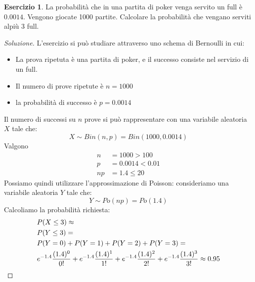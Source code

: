 \documentclass{article}
\theoremstyle{plain}
\theoremstyle{definition}
\newtheorem{esercizio}{Esercizio}[section]
\theoremstyle{remark}
\newenvironment{soluzione}
	{\renewcommand\qedsymbol{$\mathwitch*$}\begin{proof}[Soluzione]}
	{\end{proof}}
\renewcommand{\qedsymbol}{$\mathrightghost$}
\begin{document}
\begin{esercizio}
	La probabilità che in una partita di poker venga servito un full è $0.0014$. Vengono giocate 1000 partite. Calcolare la probabilità che vengano serviti alpiù 3 full.
	\begin{soluzione}
		L'esercizio si può studiare attraverso uno schema di Bernoulli in cui:
		\begin{itemize}
			\item La prova ripetuta è una partita di poker, e il successo consiste nel servizio di un full.
			\item Il numero di prove ripetute è $n=1000$
			\item la probabilità di successo è $p=0.0014$
		\end{itemize}
		Il numero di successi su $n$ prove si può rappresentare con una variabile aleatoria $X$ tale che:
		\begin{equation*}
			X\sim Bin(n,p)=Bin(1000,0.0014)
		\end{equation*}
		Valgono
		\begin{align*}
			n&=1000>100\\
			p&=0.0014<0.01\\
			np&=1.4\leq20
		\end{align*}
		Possiamo quindi utilizzare l'approssimazione di Poisson: consideriamo una variabile aleatoria $Y$ tale che:
		\begin{equation*}
			Y\sim Po(np)=Po(1.4)
		\end{equation*}
		Calcoliamo la probabilità richiesta:
		\begin{align*}
			&P(X\leq3)\approx\\
			& P(Y\leq3)=\\
			&P(Y=0)+P(Y=1)+P(Y=2)+P(Y=3)=\\
			&e^{-1.4}\frac{(1.4)^0}{0!}+e^{-1.4}\frac{(1.4)^1}{1!}+e^{-1.4}\frac{(1.4)^2}{2!}+e^{-1.4}\frac{(1.4)^3}{3!}\approx0.95\qedhere
		\end{align*}
	\end{soluzione}
\end{esercizio}
\end{document}
